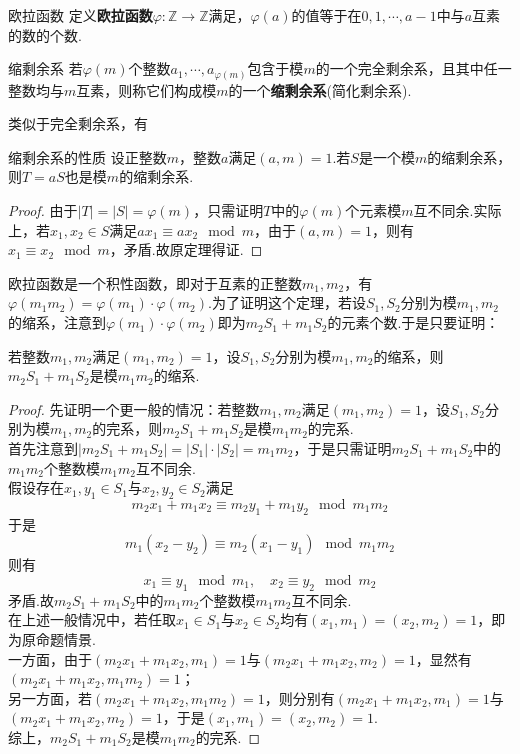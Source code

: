 \begin{definition}{欧拉函数}
	定义\textbf{欧拉函数}$\varphi :\mathbb{Z} \to \mathbb{Z}$满足，$\varphi (a)$的值等于在$0,1,\cdots ,a-1$中与$a$互素的数的个数.
\end{definition}

\begin{definition}{缩剩余系}
	若$\varphi (m)$个整数$a_1,\cdots ,a_{\varphi (m)}$包含于模$m$的一个完全剩余系，且其中任一整数均与$m$互素，则称它们构成模$m$的一个\textbf{缩剩余系}(简化剩余系).
\end{definition}

类似于完全剩余系，有

\begin{theorem}{缩剩余系的性质}
	设正整数$m$，整数$a$满足$(a,m)=1$.若$S$是一个模$m$的缩剩余系，则$T=aS$也是模$m$的缩剩余系.
\end{theorem}
\begin{proof}
	由于$|T|=|S|=\varphi (m)$，只需证明$T$中的$\varphi (m)$个元素模$m$互不同余.实际上，若$x_1,x_2 \in S$满足$ax_1 \equiv ax_2 \mod m$，由于$(a,m)=1$，则有$x_1 \equiv x_2 \mod m$，矛盾.故原定理得证.
\end{proof}

欧拉函数是一个积性函数，即对于互素的正整数$m_1,m_2$，有$\varphi (m_1m_2) = \varphi (m_1) \cdot \varphi (m_2)$.为了证明这个定理，若设$S_1,S_2$分别为模$m_1,m_2$的缩系，注意到$\varphi (m_1) \cdot \varphi (m_2)$即为$m_2S_1+m_1S_2$的元素个数.于是只要证明：

\begin{theorem}
	若整数$m_1,m_2$满足$(m_1,m_2)=1$，设$S_1,S_2$分别为模$m_1,m_2$的缩系，则$m_2S_1+m_1S_2$是模$m_1m_2$的缩系.
\end{theorem}
\begin{proof}
	 先证明一个更一般的情况：若整数$m_1,m_2$满足$(m_1,m_2)=1$，设$S_1,S_2$分别为模$m_1,m_2$的完系，则$m_2S_1+m_1S_2$是模$m_1m_2$的完系. \\
	首先注意到$|m_2S_1+m_1S_2|=|S_1| \cdot |S_2|=m_1m_2$，于是只需证明$m_2S_1+m_1S_2$中的$m_1m_2$个整数模$m_1m_2$互不同余. \\
	假设存在$x_1,y_1 \in S_1$与$x_2,y_2 \in S_2$满足$$m_2x_1 + m_1x_2 \equiv m_2y_1 + m_1y_2 \mod m_1m_2$$
	于是$$m_1(x_2-y_2) \equiv m_2(x_1-y_1) \mod m_1m_2$$
	则有$$x_1 \equiv y_1 \mod m_1,\quad x_2 \equiv y_2 \mod m_2$$
	矛盾.故$m_2S_1+m_1S_2$中的$m_1m_2$个整数模$m_1m_2$互不同余. \\
	 在上述一般情况中，若任取$x_1 \in S_1$与$x_2 \in S_2$均有$(x_1,m_1)=(x_2,m_2)=1$，即为原命题情景. \\
	一方面，由于$(m_2x_1+m_1x_2,m_1)=1$与$(m_2x_1+m_1x_2,m_2)=1$，显然有$(m_2x_1+m_1x_2,m_1m_2)=1$； \\
	另一方面，若$(m_2x_1+m_1x_2,m_1m_2)=1$，则分别有$(m_2x_1+m_1x_2,m_1)=1$与$(m_2x_1+m_1x_2,m_2)=1$，于是$(x_1,m_1)=(x_2,m_2)=1$. \\
	综上，$m_2S_1+m_1S_2$是模$m_1m_2$的完系.
\end{proof}

